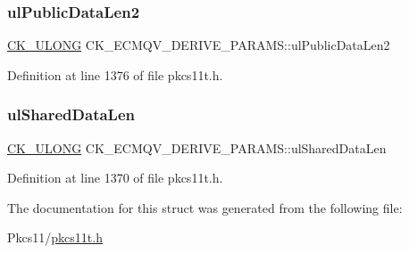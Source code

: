 \subsubsection{\texorpdfstring{ul\+Public\+Data\+Len2}{ulPublicDataLen2}}
{\footnotesize\ttfamily \hyperlink{pkcs11t_8h_a35181858a3b7a0a81f49d180d8f446ef}{C\+K\+\_\+\+U\+L\+O\+NG} C\+K\+\_\+\+E\+C\+M\+Q\+V\+\_\+\+D\+E\+R\+I\+V\+E\+\_\+\+P\+A\+R\+A\+M\+S\+::ul\+Public\+Data\+Len2}



Definition at line 1376 of file pkcs11t.\+h.

\mbox{\label{struct_c_k___e_c_m_q_v___d_e_r_i_v_e___p_a_r_a_m_s_a4f8f542bd44043a05653f0f6c8b66a6d}} 
\subsubsection{\texorpdfstring{ul\+Shared\+Data\+Len}{ulSharedDataLen}}
{\footnotesize\ttfamily \hyperlink{pkcs11t_8h_a35181858a3b7a0a81f49d180d8f446ef}{C\+K\+\_\+\+U\+L\+O\+NG} C\+K\+\_\+\+E\+C\+M\+Q\+V\+\_\+\+D\+E\+R\+I\+V\+E\+\_\+\+P\+A\+R\+A\+M\+S\+::ul\+Shared\+Data\+Len}



Definition at line 1370 of file pkcs11t.\+h.



The documentation for this struct was generated from the following file\+:\begin{DoxyCompactItemize}
\item 
Pkcs11/\hyperlink{pkcs11t_8h}{pkcs11t.\+h}\end{DoxyCompactItemize}
